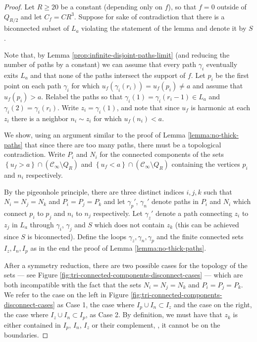 \documentclass[12pt]{amsart}
\numberwithin{equation}{section}
\begin{document}
	\begin{proof}
		Let $R \geq 20$ be a constant (depending only on $f$), so that $f = 0$ outside of $Q_{R/2}$ and let $C_f = C R^3$. 
		Suppose for sake of contradiction that there is a biconnected subset of $L_a$ violating the statement of the lemma
		and denote it by $S$. 
		
		Note that, by Lemma \ref{prop:infinite-disjoint-paths-limit} (and reducing the number of paths by a constant) we can assume that every path $\gamma_i$ eventually exits $L_a$ and that none of the paths intersect the support of $f$. 
		Let $p_i$ be the first point on each path $\gamma_i$ for which $u_f(\gamma_i(r_i)) = u_f(p_i) \neq a$ and assume that $u_f(p_i) > a$. Relabel the paths 
		so that $\gamma_i(1) = \gamma_i(r_i-1) \in L_a$ and $\gamma_i(2) = \gamma_i(r_i)$.   Write $z_i = \gamma_i(1)$, and note that since $u_f$ is harmonic at each $z_i$ there is a neighbor $n_i \sim z_i$ for which $u_f(n_i) < a$.
		
		We show, using an argument similar to the proof of Lemma \ref{lemma:no-thick-paths} that since there are too many paths, there must be a topological contradiction. 
		Write $P_i$ and $N_i$ for the connected components of the sets $ \left\{u_f > a  \right\} \cap (\mathscr{C}_{\infty} \setminus Q_R)$ and $ \left\{u_f < a  \right\} \cap (\mathscr{C}_{\infty} \setminus Q_R)$ containing the vertices $p_i$ and $n_i$ respectively. 
		
		By the pigeonhole principle, there are three distinct indices $i, j, k$ such that $N_i = N_{j} = N_k$ and $P_i = P_{j} = P_k$ and let $\gamma_p'$, $\gamma_n'$ denote paths in $P_i$ and $N_i$ which connect $p_{i}$ to $p_{j}$ and $n_{i}$ to $n_{j}$ respectively. 
		Let $\gamma_z'$ denote a path connecting $z_{i}$ to $z_{j}$ in $L_a$ through $\gamma_i$, $\gamma_{j}$ and $S$ which does not contain $z_k$ (this can be achieved since $S$ is biconnected). Define the loops $\gamma_z, \gamma_n, \gamma_p$
		and the finite connected sets $I_z, I_n, I_p$ as in the end the proof of Lemma \ref{lemma:no-thick-paths}. 
		
		After a symmetry reduction, there are two possible cases for the topology of the sets --- see Figure \ref{fig:tri-connected-components-disconnect-cases} ---
		which are both incompatible with the fact that the sets $N_i = N_j = N_k$ and $P_i = P_j = P_k$. 
		We refer  to the case on the left in Figure \ref{fig:tri-connected-components-disconnect-cases} as Case 1, the case where $I_p \cup I_n \subset I_z$ and the case on the right, the case where $I_z \cup I_n \subset I_p$, as Case 2. By definition, we must have that $z_k$ is either contained in $I_p$, $I_n$, $I_z$ or their complement, \ie, it cannot be on the boundaries. 
		\medskip
		

\end{proof}
\end{document}
